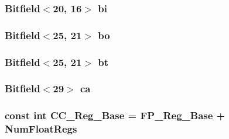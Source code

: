 \label{namespacePowerISA_a5e90480067c558846fc7ae7b4c845315}
\hypertarget{namespacePowerISA_a343aa64358b3471366288f5a0fa62fdf}{
\subsubsection[{bi}]{\setlength{\rightskip}{0pt plus 5cm}Bitfield$<$20, 16$>$ {\bf bi}}}
\label{namespacePowerISA_a343aa64358b3471366288f5a0fa62fdf}
\hypertarget{namespacePowerISA_a3b4fd160410ed28184c730d83b3799c8}{
\subsubsection[{bo}]{\setlength{\rightskip}{0pt plus 5cm}Bitfield$<$25, 21$>$ {\bf bo}}}
\label{namespacePowerISA_a3b4fd160410ed28184c730d83b3799c8}
\hypertarget{namespacePowerISA_af20c9a0d3fd487150d22bafc9725cc46}{
\subsubsection[{bt}]{\setlength{\rightskip}{0pt plus 5cm}Bitfield$<$25, 21$>$ {\bf bt}}}
\label{namespacePowerISA_af20c9a0d3fd487150d22bafc9725cc46}
\hypertarget{namespacePowerISA_a103ecf74d510034f16278decd1fc9f34}{
\subsubsection[{ca}]{\setlength{\rightskip}{0pt plus 5cm}Bitfield$<$29$>$ {\bf ca}}}
\label{namespacePowerISA_a103ecf74d510034f16278decd1fc9f34}
\hypertarget{namespacePowerISA_ab1d4916ec3ee18e808b3452603742d38}{
\subsubsection[{CC\_\-Reg\_\-Base}]{\setlength{\rightskip}{0pt plus 5cm}const int {\bf CC\_\-Reg\_\-Base} = {\bf FP\_\-Reg\_\-Base} + {\bf NumFloatRegs}}}
\label{namespacePowerISA_ab1d4916ec3ee18e808b3452603742d38}
\hypertarget{namespacePowerISA_a1dae322bf8ef83af996e2e1534f3036d}{
\subsubsection[{cr1}]{}}
